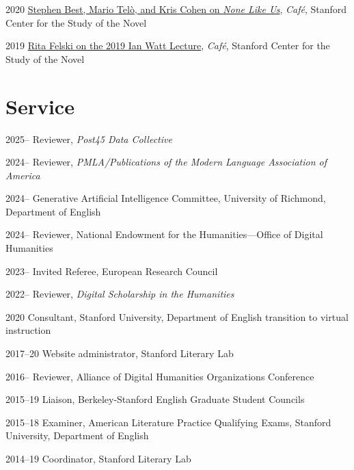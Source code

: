 \documentclass[12pt,letterpaper]{report}
\begin{document}
\begin{tablist}
	\item[2020] \tab{}\href{https://web.archive.org/web/20220429093211/https://novel.stanford.edu/csn-cafe/2021/7/23/books-at-the-center-stephen-best-mario-tel-and-kris-cohen-on-none-like-us-101019}{Stephen Best, Mario Telò, and Kris Cohen on \emph{None Like Us}}, \emph{Café}, Stanford Center for the Study of the Novel
	\item[2019] \tab{}\href{https://web.archive.org/web/20220429093144/https://novel.stanford.edu/csn-cafe/2021/7/23/rita-felski-on-her-2019-ian-watt-lecture-5319}{Rita Felski on the 2019 Ian Watt Lecture}, \emph{Café}, Stanford Center for the Study of the Novel
\end{tablist}

\section*{Service}

\begin{tablist}
	\item[2025--] \tab{}Reviewer, \emph{Post45 Data Collective}
	\item[2024--] \tab{}Reviewer, \emph{PMLA/Publications of the Modern Language Association of America}
	\item[2024--] \tab{}Generative Artificial Intelligence Committee, University of Richmond, Department of English
	\item[2024--] \tab{}Reviewer, National Endowment for the Humanities—Office of Digital Humanities
	\item[2023--] \tab{}Invited Referee, European Research Council
	\item[2022--] \tab{}Reviewer, \textit{Digital Scholarship in the Humanities}
	\item[2020] \tab{}Consultant, Stanford University, Department of English transition to virtual instruction
	\item[2017--20] \tab{}Website administrator, Stanford Literary Lab
	\item[2016--] \tab{}Reviewer, Alliance of Digital Humanities Organizations Conference
	\item[2015--19] \tab{}Liaison, Berkeley-Stanford English Graduate Student Councils
	\item[2015--18] \tab{}Examiner, American Literature Practice Qualifying Exams, Stanford University, Department of English
	\item[2014--19] \tab{}Coordinator, Stanford Literary Lab
\end{tablist}
\end{document}
